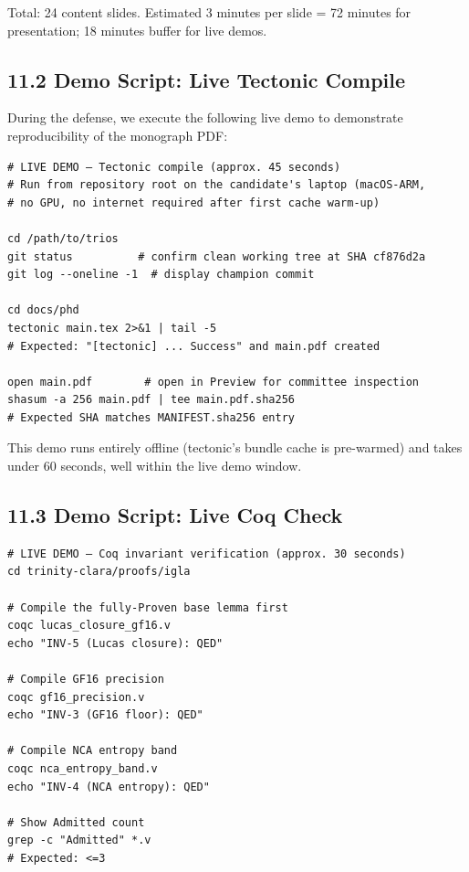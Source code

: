 Total: 24 content slides.  Estimated 3 minutes per slide = 72 minutes
for presentation; 18 minutes buffer for live demos.

\subsection{11.2 Demo Script: Live Tectonic Compile}%
\label{sec:demo-tectonic}

During the defense, we execute the following live demo to demonstrate
reproducibility of the monograph PDF:

\begin{verbatim}
# LIVE DEMO — Tectonic compile (approx. 45 seconds)
# Run from repository root on the candidate's laptop (macOS-ARM,
# no GPU, no internet required after first cache warm-up)

cd /path/to/trios
git status          # confirm clean working tree at SHA cf876d2a
git log --oneline -1  # display champion commit

cd docs/phd
tectonic main.tex 2>&1 | tail -5
# Expected: "[tectonic] ... Success" and main.pdf created

open main.pdf        # open in Preview for committee inspection
shasum -a 256 main.pdf | tee main.pdf.sha256
# Expected SHA matches MANIFEST.sha256 entry
\end{verbatim}

This demo runs entirely offline (tectonic's bundle cache is pre-warmed)
and takes under 60 seconds, well within the live demo window.

\subsection{11.3 Demo Script: Live Coq Check}%
\label{sec:demo-coq}

\begin{verbatim}
# LIVE DEMO — Coq invariant verification (approx. 30 seconds)
cd trinity-clara/proofs/igla

# Compile the fully-Proven base lemma first
coqc lucas_closure_gf16.v
echo "INV-5 (Lucas closure): QED"

# Compile GF16 precision
coqc gf16_precision.v
echo "INV-3 (GF16 floor): QED"

# Compile NCA entropy band
coqc nca_entropy_band.v
echo "INV-4 (NCA entropy): QED"

# Show Admitted count
grep -c "Admitted" *.v
# Expected: <=3
\end{verbatim}


